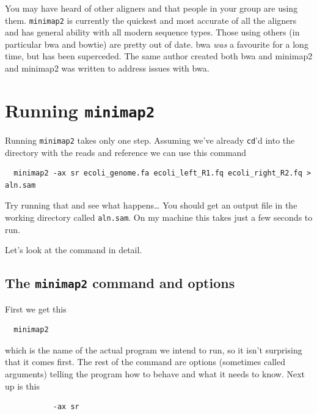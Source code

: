 \documentclass[]{book}
\begin{document}
You may have heard of other aligners and that people in your group are using them. \texttt{minimap2} is currently the quickest and most accurate of all the aligners and has general ability with all modern sequence types. Those using others (in particular bwa and bowtie) are pretty out of date. bwa \emph{was} a favourite for a long time, but has been superceded. The same author created both bwa and minimap2 and minimap2 was written to address issues with bwa.

\hypertarget{running-minimap2}{%
\chapter{\texorpdfstring{Running \texttt{minimap2}}{Running minimap2}}\label{running-minimap2}}

Running \texttt{minimap2} takes only one step. Assuming we've already \texttt{cd}'d into the directory with the reads and reference we can use this command

\begin{verbatim}
  minimap2 -ax sr ecoli_genome.fa ecoli_left_R1.fq ecoli_right_R2.fq > aln.sam
\end{verbatim}

Try running that and see what happens\ldots{} You should get an output file in the working directory called \texttt{aln.sam}. On my machine this takes just a few seconds to run.

Let's look at the command in detail.

\hypertarget{the-minimap2-command-and-options}{%
\section{\texorpdfstring{The \texttt{minimap2} command and options}{The minimap2 command and options}}\label{the-minimap2-command-and-options}}

First we get this

\begin{verbatim}
  minimap2
\end{verbatim}

which is the name of the actual program we intend to run, so it isn't surprising that it comes first. The rest of the command are options (sometimes called arguments) telling the program how to behave and what it needs to know. Next up is this

\begin{verbatim}
           -ax sr
\end{verbatim}
\end{document}
